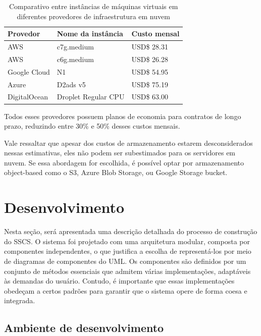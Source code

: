 \documentclass[12pt, %
openright, 
oneside, %
a4paper,    %
brazil]{facom-ufu-abntex2}
\begin{document}
\begin{table}[ht]
	\centering
	\caption{Comparativo entre instâncias de máquinas virtuais em
		diferentes provedores de infraestrutura em nuvem}
	\label{tab:estima}
	\begin{tabular}{|l|l|l|}
		\hline
		Provedor     & Nome da instância   & Custo mensal
		\\ \hline
		AWS          & c7g.medium          & USD\$ 28.31
		\\ \hline
		AWS          & c6g.medium          & USD\$ 26.28
		\\ \hline
		Google Cloud & N1                  & USD\$ 54.95
		\\ \hline
		Azure        & D2ads v5            & USD\$ 75.19
		\\ \hline
		DigitalOcean & Droplet Regular CPU & USD\$ 63.00
		\\ \hline
	\end{tabular}
\end{table}

Todos esses provedores possuem planos de economia para contratos de longo
prazo, reduzindo entre 30\% e 50\% desses custos mensais.

Vale ressaltar que apesar dos custos de armazenamento estarem desconsiderados
nessas estimativas, eles não podem ser subestimados para os servidores em
nuvem. Se essa abordagem for escolhida, é possível optar por armazenamento
object-based como o S3, Azure Blob Storage, ou Google Storage bucket.

\chapter{Desenvolvimento}

Nesta seção, será apresentada uma descrição detalhada do processo de construção
do SSCS. O sistema foi projetado com uma arquitetura modular, composta por
componentes independentes, o que justifica a escolha de representá-los por meio
de diagramas de componentes do UML. Os componentes são definidos por um
conjunto de métodos essenciais que admitem várias implementações, adaptáveis às
demandas do usuário. Contudo, é importante que essas implementações obedeçam a
certos padrões para garantir que o sistema opere de forma coesa e integrada.

\section{Ambiente de desenvolvimento}
\label{sec:amb}
\end{document}
